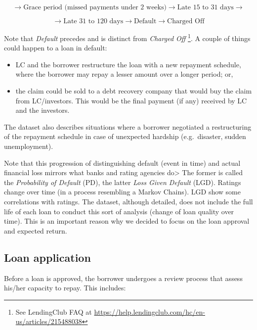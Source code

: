\documentclass[11pt,]{report}
\let\rmarkdownfootnote\footnote%
\def\footnote{\protect\rmarkdownfootnote}
\begin{document}
\[
\rightarrow \text{Grace period (missed payments under 2 weeks)} \rightarrow \text{Late 15 to 31 days} \rightarrow
\]

\[
\rightarrow  \text{Late 31 to 120 days} \rightarrow  \text{Default} \rightarrow  \text{Charged Off}
\]

Note that \emph{Default} precedes and is distinct from \emph{Charged Off} \footnote{See LendingClub FAQ at \url{https://help.lendingclub.com/hc/en-us/articles/215488038}}. A couple of things could happen to a loan in default:

\begin{itemize}
\item
  LC and the borrower restructure the loan with a new repayment schedule, where the borrower may repay a lesser amount over a longer period; or,
\item
  the claim could be sold to a debt recovery company that would buy the claim from LC/investors. This would be the final payment (if any) received by LC and the investors.
\end{itemize}

The dataset also describes situations where a borrower negotiated a restructuring of the repayment schedule in case of unexpected hardship (e.g.~disaster, sudden unemployment).

Note that this progression of distinguishing default (event in time) and actual financial loss mirrors what banks and rating agencies do\textgreater{} The former is called the \emph{Probability of Default} (PD), the latter \emph{Loss Given Default} (LGD). Ratings change over time (in a process resembling a Markov Chains). LGD show some correlations with ratings. The dataset, although detailed, does not include the full life of each loan to conduct this sort of analysis (change of loan quality over time). This is an important reason why we decided to focus on the loan approval and expected return.

\hypertarget{loan-application}{%
\subsection{Loan application}\label{loan-application}}

Before a loan is approved, the borrower undergoes a review process that assess his/her capacity to repay. This includes:
\end{document}
